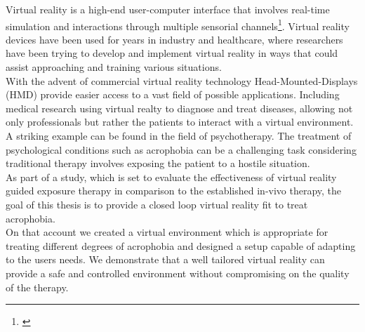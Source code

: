 


Virtual reality is a high-end user-computer interface that involves real-time simulation and interactions through multiple sensorial channels\footnote{\citet*{burdea2003virtual}}. Virtual reality devices have been used for years in industry and healthcare, where researchers have been trying to develop and implement virtual reality in ways that could assist approaching and training various situations.\\
With the advent of commercial virtual reality technology Head-Mounted-Displays (HMD) provide easier access to a vast field of possible applications. Including medical research using virtual realty to diagnose and treat diseases, allowing not only professionals but rather the patients to interact with a virtual environment.\\
A striking example can be found in the field of psychotherapy.
The treatment of psychological conditions such as acrophobia can be a challenging task considering traditional therapy involves exposing the patient to a hostile situation.\\
As part of a study, which is set to evaluate the effectiveness of virtual reality guided exposure therapy in comparison to the established in-vivo therapy, the goal of this thesis is to provide a closed loop virtual reality fit to treat acrophobia.\\
On that account we created a virtual environment which is appropriate for treating different degrees of acrophobia and designed a setup capable of adapting to the users needs. We demonstrate that a well tailored virtual reality can provide a safe and controlled environment without compromising on the quality of the therapy.\\



%
